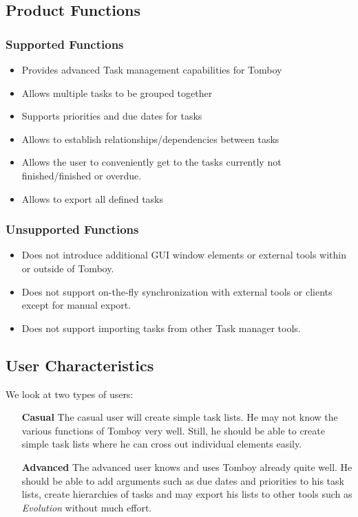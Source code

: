 \subsection{Product Functions}
\label{description:functions}

  \subsubsection*{Supported Functions}
  \label{description:functions:supported}

    \begin{itemize}
      \item Provides advanced Task management capabilities for Tomboy
      \item Allows multiple tasks to be grouped together
      \item Supports priorities and due dates for tasks
      \item Allows to establish relationships/dependencies between tasks
      \item Allows the user to conveniently get to the tasks currently not finished/finished or overdue.
      \item Allows to export all defined tasks
    \end{itemize}

    \subsubsection*{Unsupported Functions}
      \label{description:functions:unsupported}
      \begin{itemize}
        \item Does not introduce additional GUI window elements or external tools within or outside of Tomboy.
        \item Does not support on-the-fly synchronization with external tools or clients except for manual export.
        \item Does not support importing tasks from other Task manager tools.
      \end{itemize}

\subsection{User Characteristics}
\label{description:usercharacteristics}
We look at two types of users:

  \begin{itemize}
    \item[\bf{Casual}] The casual user will create simple task lists. He may not know the various functions of Tomboy very well. Still, he should be able to create simple task lists where he can cross out individual elements easily.

    \item[\bf{Advanced}] The advanced user knows and uses Tomboy already quite well. He should be able to add arguments such as due dates and priorities to his task lists, create hierarchies of tasks and may export his lists to other tools such as \textit{Evolution} without much effort.
  \end{itemize}


